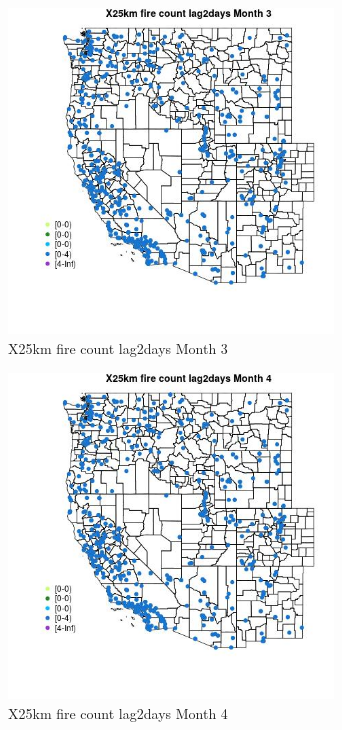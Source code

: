 \begin{figure} 
\centering  
\includegraphics[width=0.77\textwidth]{Code_Outputs/Report_ML_input_PM25_Step4_part_e_de_duplicated_aves_compiled_2019-05-14wNAs_MapObsMo3X25km_fire_count_lag2days.jpg} 
\caption{\label{fig:Report_ML_input_PM25_Step4_part_e_de_duplicated_aves_compiled_2019-05-14wNAsMapObsMo3X25km_fire_count_lag2days}X25km fire count lag2days Month 3} 
\end{figure} 
 

\begin{figure} 
\centering  
\includegraphics[width=0.77\textwidth]{Code_Outputs/Report_ML_input_PM25_Step4_part_e_de_duplicated_aves_compiled_2019-05-14wNAs_MapObsMo4X25km_fire_count_lag2days.jpg} 
\caption{\label{fig:Report_ML_input_PM25_Step4_part_e_de_duplicated_aves_compiled_2019-05-14wNAsMapObsMo4X25km_fire_count_lag2days}X25km fire count lag2days Month 4} 
\end{figure} 
 

